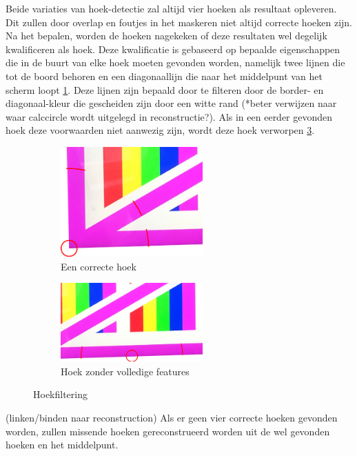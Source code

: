 Beide variaties van hoek-detectie zal altijd vier hoeken als resultaat opleveren. Dit zullen door overlap en foutjes in het maskeren niet altijd correcte hoeken zijn. Na het bepalen, worden de hoeken nagekeken of deze resultaten wel degelijk kwalificeren als hoek. Deze kwalificatie is gebaseerd op bepaalde eigenschappen die in de buurt van elke hoek moeten gevonden worden, namelijk twee lijnen die tot de boord behoren en een diagonaallijn die naar het middelpunt van het scherm loopt \ref{fig:correcte hoek}. Deze lijnen zijn bepaald door te filteren door de border- en diagonaal-kleur die gescheiden zijn door een witte rand (*beter verwijzen naar waar calccircle wordt uitgelegd in reconstructie?). Als in een eerder gevonden hoek deze voorwaarden niet aanwezig zijn, wordt deze hoek verworpen \ref{fig:foute hoek}.

\begin{figure}[h] 
\centering
\begin{subfigure}{0.5\textwidth}
\centering
\includegraphics[width=0.6\textwidth]{img/correctCorner.png}
\caption{Een correcte hoek}
\label{fig:correcte hoek}
\end{subfigure}%
\begin{subfigure}{0.5\textwidth}
\centering
\includegraphics[width=0.6\textwidth]{img/notACorner.png}
\caption{Hoek zonder volledige features}
\label{fig:foute hoek}
\end{subfigure}
\caption{Hoekfiltering}
\end{figure}
(linken/binden naar reconstruction) Als er geen vier correcte hoeken gevonden worden, zullen missende hoeken gereconstrueerd worden uit de wel gevonden hoeken en het middelpunt.